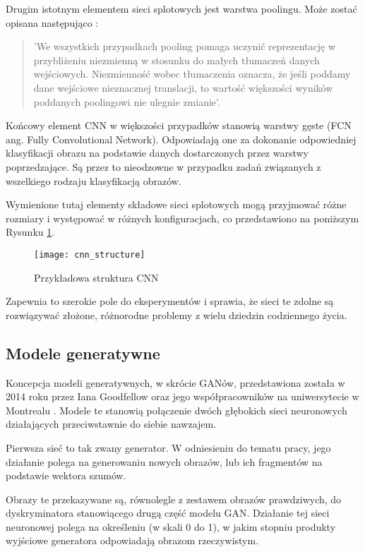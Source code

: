     Drugim istotnym elementem sieci splotowych jest warstwa poolingu. Może zostać opisana następująco \cite{pooling}:
    \begin{quote}
      'We wszystkich przypadkach pooling pomaga uczynić reprezentację w przybliżeniu niezmienną w stosunku do małych tłumaczeń danych wejściowych. Niezmienność wobec tłumaczenia oznacza, że jeśli poddamy dane wejściowe nieznacznej translacji, to wartość większości wyników poddanych poolingowi nie ulegnie zmianie'.
    \end{quote}

    Końcowy element CNN w większości przypadków stanowią warstwy gęste (FCN ang. Fully Convolutional Network). Odpowiadają one za dokonanie odpowiedniej klasyfikacji obrazu na podstawie danych dostarczonych przez warstwy poprzedzające. Są przez to nieodzowne w przypadku zadań związanych z wszelkiego rodzaju klasyfikacją obrazów.

    Wymienione tutaj elementy składowe sieci splotowych mogą przyjmować różne rozmiary i występować w różnych konfiguracjach, co przedstawiono na poniższym Rysunku \ref{fig:cnn_structure}.
    \begin{figure}[h]
     \centering
     \texttt{[image: cnn\_structure]}
     \caption{Przykładowa struktura CNN}
     \label{fig:cnn_structure}
    \end{figure}
    \newline
    Zapewnia to szerokie pole do eksperymentów i sprawia, że sieci te zdolne są rozwiązywać złożone, różnorodne problemy z wielu dziedzin codziennego życia.

  \subsection{Modele generatywne}
  \label{modele_generatywne}
  Koncepcja modeli generatywnych, w skrócie GANów, przedstawiona została w 2014 roku przez Iana Goodfellow oraz jego współpracowników na uniwersytecie w Montrealu \cite{gan}. Modele te stanowią połączenie dwóch głębokich sieci neuronowych działających przeciwstawnie do siebie nawzajem.

  Pierwsza sieć to tak zwany generator. W odniesieniu do tematu pracy, jego działanie polega na generowaniu nowych obrazów, lub ich fragmentów na podstawie wektora szumów.

  Obrazy te przekazywane są, równolegle z zestawem obrazów prawdziwych, do dyskryminatora stanowiącego drugą część modelu GAN. Działanie tej sieci neuronowej polega na określeniu (w skali 0 do 1), w jakim stopniu produkty wyjściowe generatora odpowiadają obrazom rzeczywistym.

